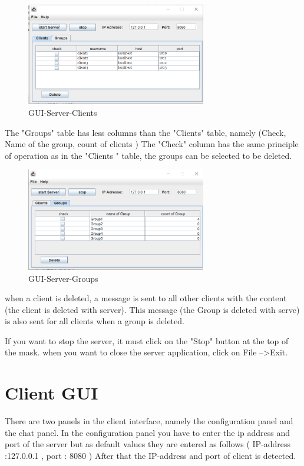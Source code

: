 \begin{figure}
    \centering
    \includegraphics[width=0.7\textwidth]{gfx/GUI_Server_Clients.png}
    \caption{GUI-Server-Clients}
    \label{fig:gui-server-clients}
\end{figure}

\noindent
The "Groups" table has less columns than the "Clients" table, namely (Check, Name of the group, count of clients )
The "Check" column has the same principle of operation as in the "Clients " table,
the groups can be selected to be deleted. 

\begin{figure}
    \centering
    \includegraphics[width=0.7\textwidth]{gfx/GUI_Server_Groups.png}
    \caption{GUI-Server-Groups}
    \label{fig:gui-server-groups}
\end{figure}

\noindent
when a client is deleted, a message is sent to all other clients with the content (the client is deleted with server).
This message (the Group is deleted with serve) is also sent for all clients when a group is deleted. 
\medskip

\noindent
If you want to stop the server, it must click on the "Stop" button at the top of the mask.
when you want to close the server application, click on File -->Exit.

\section {Client GUI}
There are two panels in the client interface, namely the configuration panel and the chat panel.
In the configuration panel you have to enter the ip address and port of the server but as default
values they are entered as follows ( IP-address :127.0.0.1 , port : 8080 ) After that the 
IP-address and port of client is detected. 
\medskip

